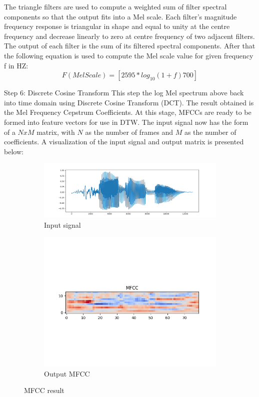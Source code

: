     The triangle filters are used to compute a weighted sum of filter spectral components so that the output fits into a Mel scale. Each filter’s magnitude frequency response is triangular in shape and equal to unity at the centre frequency and decrease linearly to zero at centre frequency of two adjacent filters. The output of each filter is the sum of its filtered spectral components. After that the following equation is used to compute the Mel scale value for given frequency f in HZ:  
    \begin{equation}
        F(Mel Scale) = [2595 *log_{10}(1+f)700]
    \end{equation}
    
    Step 6: Discrete Cosine Transform
    This step the log Mel spectrum above back into time domain using Discrete Cosine Transform (DCT). The result obtained is the Mel Frequency Cepstrum Coefficients. At this stage, MFCCs are ready to be formed into feature vectors for use in DTW. The input signal now has the form of a $NxM$ matrix, with $N$ as the number of frames and $M$ as the number of coefficients. A visualization of the input signal and output matrix is presented below:
    \begin{figure}
        \centering
        \begin{subfigure}{0.9\textwidth}
        \includegraphics [width = \linewidth]{img/Figure_3.png}
        \caption{Input signal}
        \label{fig:mfcc1}
        \end{subfigure}
        \begin{subfigure}{0.9\textwidth}
        \includegraphics[width = \linewidth]{img/mfcc.png}
        \caption{Output MFCC}
        \label{fig:mfcc2}
        \end{subfigure}
        \caption{MFCC result}
        \label{fig:mfcc}
    \end{figure}
    
